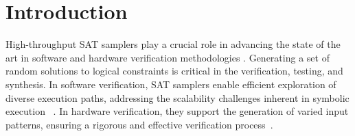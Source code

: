\vspace{-0.25cm}
\section{Introduction}

High-throughput SAT samplers play a crucial role in advancing the state of the art in software and hardware verification methodologies \cite{dutra2018quicksampler}.
Generating a set of random solutions to logical constraints is critical in the verification, testing, and synthesis.
In software verification, SAT samplers enable efficient exploration of diverse execution paths, addressing the scalability challenges inherent in symbolic execution~ \cite{Clarke1976testing, King1976symbolic, Avgerinos2014dynamic, Anand2011test, Anand2007test, Artzi2008test, Burnim2008test, Cadar2008test, Chipounov2012test, Godefroid2005test, Jayaraman2009jFuzzAC, yoshida2017test, corina2008test, saxena2010test, dawn2008test, Tillmann2008test}. In hardware verification, they support the generation of varied input patterns, ensuring a rigorous and effective verification process~\cite{Kitchen2007crv, Zhao2009crv, Naveh2013crv, Naveh2006crv}. 



